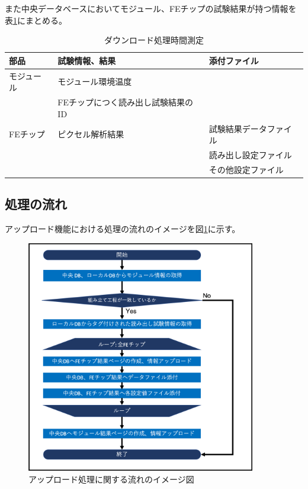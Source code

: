 また中央データベースにおいてモジュール、FEチップの試験結果が持つ情報を表\ref{electrical_parameters}にまとめる。
\begin{table}[tbp]
\begin{center}
\caption[ダウンロード処理時間測定]{ダウンロード処理時間測定}
\label{electrical_parameters}
  \begin{tabular}{|l|l|l|} \hline
    部品 & 試験情報、結果 & 添付ファイル \\ \hline\hline
    モジュール &  モジュール環境温度 & \\  
               &  FEチップにつく読み出し試験結果のID & \\  \hline
    FEチップ &  ピクセル解析結果 & 試験結果データファイル\\ 
             &                   & 読み出し設定ファイル\\
             &                   & その他設定ファイル\\ \hline 
  \end{tabular}
\end{center}
\end{table}

\subsection{処理の流れ}
アップロード機能における処理の流れのイメージを図\ref{upload_algorithm}に示す。
\begin{figure}[bpt]\centering
\includegraphics[width=10cm]{upload_algorithm}
\caption[アップロード処理に関する流れのイメージ図]{アップロード処理に関する流れのイメージ図}
\label{upload_algorithm}
\end{figure}

